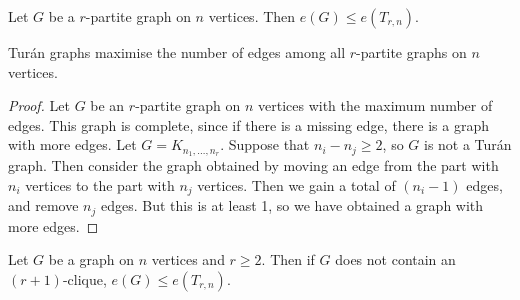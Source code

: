 \begin{proposition}
	Let \( G \) be a \( r \)-partite graph on \( n \) vertices.
	Then \( e(G) \leq e(T_{r,n}) \).
\end{proposition}
\begin{remark}
	Tur\'an graphs maximise the number of edges among all \( r \)-partite graphs on \( n \) vertices.
\end{remark}
\begin{proof}
	Let \( G \) be an \( r \)-partite graph on \( n \) vertices with the maximum number of edges.
	This graph is complete, since if there is a missing edge, there is a graph with more edges.
	Let \( G = K_{n_1, \dots, n_r} \).
	Suppose that \( n_i - n_j \geq 2 \), so \( G \) is not a Tur\'an graph.
	Then consider the graph obtained by moving an edge from the part with \( n_i \) vertices to the part with \( n_j \) vertices.
	Then we gain a total of \( (n_i - 1) \) edges, and remove \( n_j \) edges.
	But this is at least 1, so we have obtained a graph with more edges.
\end{proof}
\begin{theorem}
	Let \( G \) be a graph on \( n \) vertices and \( r \geq 2 \).
	Then if \( G \) does not contain an \( (r+1) \)-clique, \( e(G) \leq e(T_{r,n}) \).
\end{theorem}

